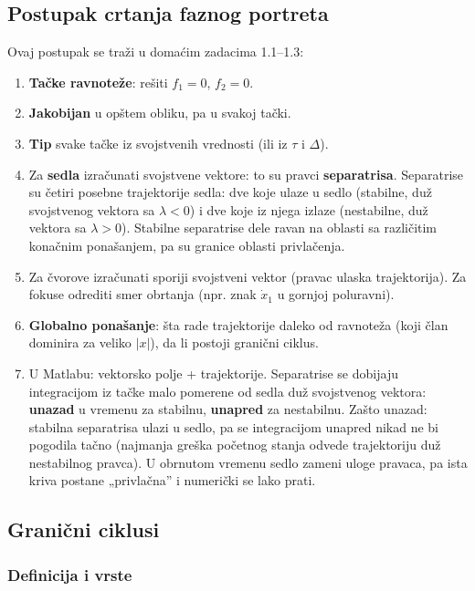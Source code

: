 \documentclass[11pt,a4paper,parskip=half,headsepline,numbers=noenddot]{scrartcl}
\begin{document}
\subsection{Postupak crtanja faznog portreta}

Ovaj postupak se traži u domaćim zadacima 1.1--1.3:

\begin{enumerate}
\def\labelenumi{\arabic{enumi}.}
\item \textbf{Tačke ravnoteže}: rešiti \(f_1 = 0\), \(f_2 = 0\).
\item \textbf{Jakobijan} u opštem obliku, pa u svakoj tački.
\item \textbf{Tip} svake tačke iz svojstvenih vrednosti (ili iz \(\tau\) i \(\Delta\)).
\item Za \textbf{sedla} izračunati svojstvene vektore: to su pravci \textbf{separatrisa}. Separatrise su četiri posebne trajektorije sedla: dve koje ulaze u sedlo (stabilne, duž svojstvenog vektora sa \(\lambda < 0\)) i dve koje iz njega izlaze (nestabilne, duž vektora sa \(\lambda > 0\)). Stabilne separatrise dele ravan na oblasti sa različitim konačnim ponašanjem, pa su granice oblasti privlačenja.
\item Za čvorove izračunati sporiji svojstveni vektor (pravac ulaska trajektorija). Za fokuse odrediti smer obrtanja (npr. znak \(\dot x_1\) u gornjoj poluravni).
\item \textbf{Globalno ponašanje}: šta rade trajektorije daleko od ravnoteža (koji član dominira za veliko \(|x|\)), da li postoji granični ciklus.
\item U Matlabu: vektorsko polje + trajektorije. Separatrise se dobijaju integracijom iz tačke malo pomerene od sedla duž svojstvenog vektora: \textbf{unazad} u vremenu za stabilnu, \textbf{unapred} za nestabilnu. Zašto unazad: stabilna separatrisa ulazi u sedlo, pa se integracijom unapred nikad ne bi pogodila tačno (najmanja greška početnog stanja odvede trajektoriju duž nestabilnog pravca). U obrnutom vremenu sedlo zameni uloge pravaca, pa ista kriva postane „privlačna'' i numerički se lako prati.
\end{enumerate}

\subsection{Granični ciklusi}

\subsubsection{Definicija i vrste}
\end{document}
